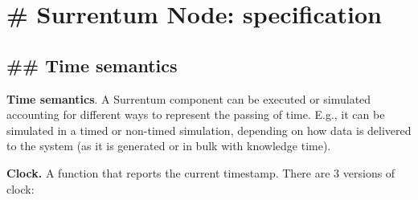 \documentclass[11pt, reqno]{amsart}
\begin{document}
\hypertarget{surrentum-node-specification}{%
\section{\# Surrentum Node:
specification}\label{surrentum-node-specification}}

\hypertarget{time-semantics}{%
\subsection{\#\# Time semantics}\label{time-semantics}}

\textbf{Time semantics}. A Surrentum component can be executed or
simulated accounting for different ways to represent the passing of
time. E.g., it can be simulated in a timed or non-timed simulation,
depending on how data is delivered to the system (as it is generated or
in bulk with knowledge time).

\textbf{Clock.} A function that reports the current timestamp. There are
3 versions of clock:
\end{document}
